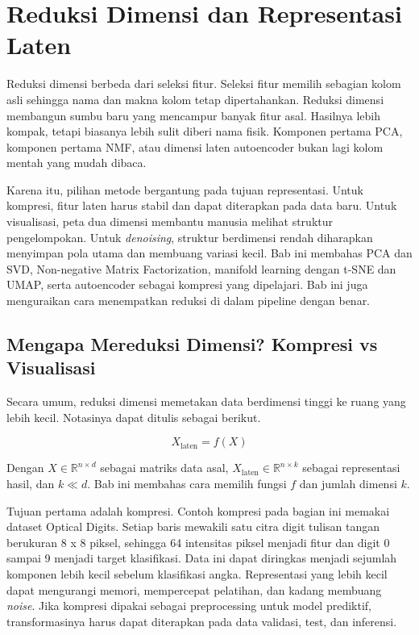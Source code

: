 \chapter{Reduksi Dimensi dan Representasi Laten}\label{reduksi-dimensi-dan-representasi-laten}

Reduksi dimensi berbeda dari seleksi fitur. Seleksi fitur memilih sebagian kolom asli sehingga nama dan makna kolom tetap dipertahankan. Reduksi dimensi membangun sumbu baru yang mencampur banyak fitur asal. Hasilnya lebih kompak, tetapi biasanya lebih sulit diberi nama fisik. Komponen pertama PCA, komponen pertama NMF, atau dimensi laten autoencoder bukan lagi kolom mentah yang mudah dibaca.

Karena itu, pilihan metode bergantung pada tujuan representasi. Untuk kompresi, fitur laten harus stabil dan dapat diterapkan pada data baru. Untuk visualisasi, peta dua dimensi membantu manusia melihat struktur pengelompokan. Untuk \emph{denoising}, struktur berdimensi rendah diharapkan menyimpan pola utama dan membuang variasi kecil. Bab ini membahas PCA dan SVD, Non-negative Matrix Factorization, manifold learning dengan t-SNE dan UMAP, serta autoencoder sebagai kompresi yang dipelajari. Bab ini juga menguraikan cara menempatkan reduksi di dalam pipeline dengan benar.

\section{Mengapa Mereduksi Dimensi? Kompresi vs Visualisasi}\label{mengapa-mereduksi-dimensi-kompresi-vs-visualisasi}

Secara umum, reduksi dimensi memetakan data berdimensi tinggi ke ruang yang lebih kecil. Notasinya dapat ditulis sebagai berikut.

\[
X_{\text{laten}} = f(X)
\]

Dengan \(X \in \mathbb{R}^{n \times d}\) sebagai matriks data asal, \(X_{\text{laten}} \in \mathbb{R}^{n \times k}\) sebagai representasi hasil, dan \(k \ll d\). Bab ini membahas cara memilih fungsi \(f\) dan jumlah dimensi \(k\).

Tujuan pertama adalah kompresi. Contoh kompresi pada bagian ini memakai dataset Optical Digits. Setiap baris mewakili satu citra digit tulisan tangan berukuran 8 x 8 piksel, sehingga 64 intensitas piksel menjadi fitur dan digit 0 sampai 9 menjadi target klasifikasi. Data ini dapat diringkas menjadi sejumlah komponen lebih kecil sebelum klasifikasi angka. Representasi yang lebih kecil dapat mengurangi memori, mempercepat pelatihan, dan kadang membuang \emph{noise}. Jika kompresi dipakai sebagai preprocessing untuk model prediktif, transformasinya harus dapat diterapkan pada data validasi, test, dan inferensi.


